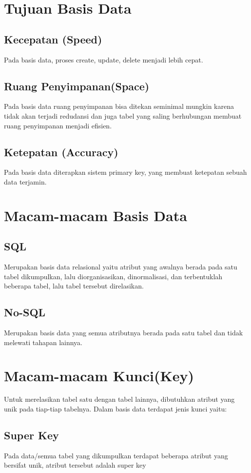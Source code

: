 \documentclass[a4paper,12pt] {article}
\begin{document}
\section{Tujuan Basis Data}
\subsection{Kecepatan (Speed)}
Pada basis data, proses create, update, delete menjadi lebih cepat.
\subsection{Ruang Penyimpanan(Space)}
Pada basis data ruang penyimpanan bisa ditekan seminimal mungkin karena tidak akan terjadi redudansi dan juga tabel yang saling berhubungan membuat ruang penyimpanan menjadi efisien.
\subsection{Ketepatan (Accuracy)}
Pada basis data diterapkan sistem primary key, yang membuat ketepatan sebuah data terjamin.


\section{Macam-macam Basis Data}
\subsection{SQL}
Merupakan basis data relasional yaitu atribut yang awalnya berada pada satu tabel dikumpulkan, lalu diorganisasikan, dinormalisasi, dan terbentuklah beberapa tabel, lalu tabel tersebut direlasikan.
\subsection{No-SQL}
Merupakan basis data yang semua atributnya berada pada satu tabel dan tidak melewati tahapan lainnya.

\section{Macam-macam Kunci(Key)}
Untuk merelasikan tabel satu dengan tabel lainnya, dibutuhkan atribut yang unik pada tiap-tiap tabelnya. Dalam basis data terdapat jenis kunci yaitu:
\subsection{Super Key}
Pada data/semua tabel yang dikumpulkan terdapat  beberapa atribut yang bersifat unik, atribut tersebut adalah super key
\end{document}

